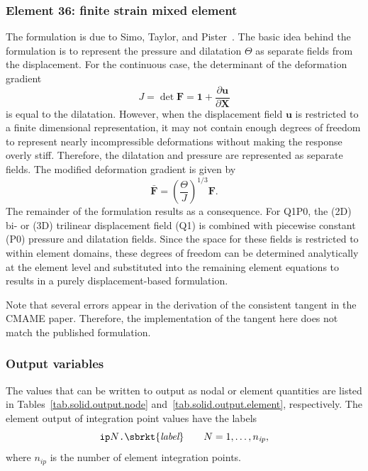 \subsubsection{Element 36: finite strain mixed element}
The formulation is due to Simo, Taylor, and Pister~\cite{Simo1985}. The basic idea behind the formulation is to represent the pressure and dilatation $\Theta$ as separate fields from the displacement. For the continuous case, the determinant of the deformation gradient 
\begin{equation}
       J = \det \mathbf{F} 
         = \mathbf{1} + \frac{\partial \mathbf{u}}{\partial \mathbf{X}} 
\end{equation}
is equal to the dilatation. However, when the displacement field $\mathbf{u}$ is restricted to a finite dimensional representation, it may not contain enough degrees of freedom to represent nearly incompressible deformations without making the response overly stiff. Therefore, the dilatation and pressure are represented as separate fields. The modified deformation gradient is given by
\begin{equation}
       \bar{\mathbf{F}} = \left( \frac{\Theta}{J} \right)^{1/3} \mathbf{F}.
\end{equation}
The remainder of the formulation results as a consequence. For Q1P0, the (2D) bi- or (3D) trilinear displacement field (Q1) is combined with piecewise constant (P0) pressure and dilatation fields. Since the space for these fields is restricted to within element domains, these degrees of freedom can be determined analytically at the element level and substituted into the remaining element equations to results in a purely displacement-based formulation.

Note that several errors appear in the derivation of the consistent tangent in the CMAME paper. Therefore, the implementation of the tangent here does not match the published formulation.

\subsubsection{Output variables}
The values that can be written to output as nodal or element 
quantities are listed in Tables~\ref{tab.solid.output.node} 
and~\ref{tab.solid.output.element}, respectively. The element output 
of integration point values have the labels
\[
\texttt{ip}N\texttt{.}\sbrkt{\textit{label}} \qquad
N=1,\ldots,n_{\textit{ip}},
\]
where $n_{\textit{ip}}$ is the number of element integration points.

